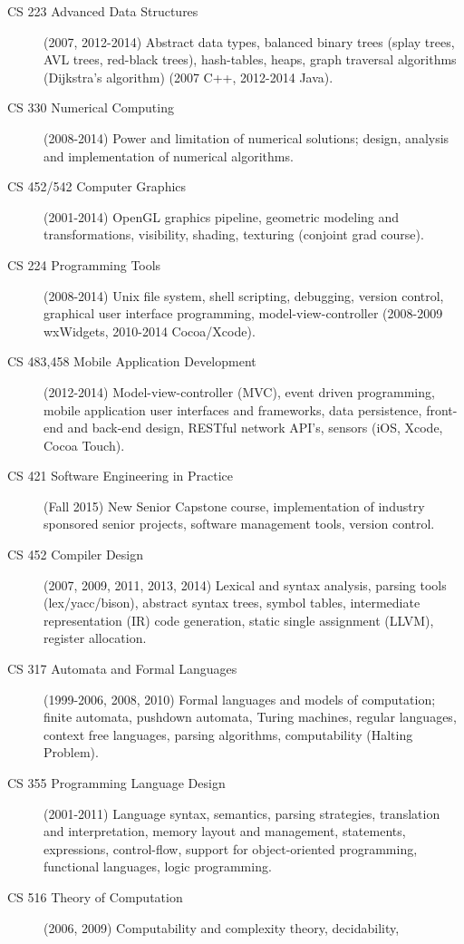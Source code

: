 \documentclass[10pt]{article}
\begin{document}
\begin{description}
  \item[CS 223 Advanced Data Structures] (2007, 2012-2014) Abstract data types, balanced binary trees (splay
     trees, AVL trees, red-black trees), hash-tables, heaps, graph traversal algorithms (Dijkstra's algorithm) 
     (2007 C++, 2012-2014 Java).
  \item[CS 330 Numerical Computing] (2008-2014) Power and limitation of numerical solutions; design, analysis 
      and implementation of numerical algorithms.
  \item[CS 452/542 Computer Graphics] (2001-2014) OpenGL %
      graphics pipeline, geometric modeling and
      transformations, visibility, shading, texturing (conjoint grad course).
  \item[CS 224 Programming Tools] (2008-2014) Unix file system, shell scripting, debugging, version control,
     graphical user interface programming, model-view-controller (2008-2009 wxWidgets, 2010-2014 Cocoa/Xcode).
  \item[CS 483,458 Mobile Application Development] (2012-2014) Model-view-controller (MVC), event driven
     programming, mobile application user interfaces and frameworks, data persistence, 
     front-end and back-end design, RESTful network API's, sensors (iOS, Xcode, Cocoa Touch).
  \item[CS 421 Software Engineering in Practice] (Fall 2015) New Senior Capstone course, implementation of
     industry sponsored senior projects, software management tools, version control.
  \item[CS 452 Compiler Design] (2007, 2009, 2011, 2013, 2014) Lexical and syntax analysis, parsing tools
     (lex/yacc/bison), abstract syntax trees, symbol tables, intermediate representation (IR) code generation,
     static single assignment (LLVM), register allocation.
  \item[CS 317 Automata and Formal Languages] (1999-2006, 2008, 2010) Formal languages and 
     models of computation; finite automata, 
     pushdown automata, Turing machines, regular languages, context free languages, parsing algorithms, 
     computability (Halting Problem).
  \item[CS 355 Programming Language Design] (2001-2011) Language syntax, semantics, parsing strategies, translation
     and interpretation, memory layout and management, statements, expressions, control-flow, support
     for object-oriented programming, functional languages, logic programming.
  \item[CS 516 Theory of Computation] (2006, 2009) Computability and complexity theory, decidability, 

\end{description}
\end{document}
